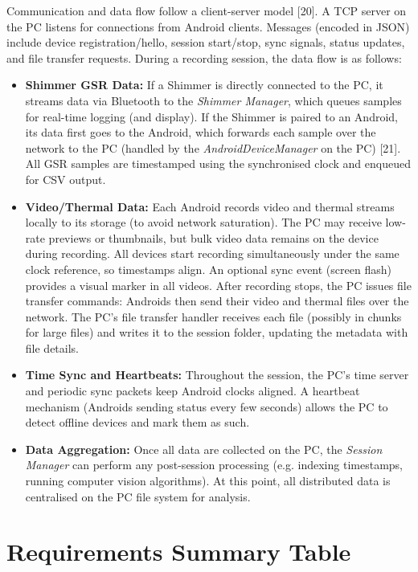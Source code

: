 Communication and data flow follow a client-server model [20]. A TCP server on the PC listens for connections from Android clients. Messages (encoded in JSON) include device registration/hello, session start/stop, sync signals, status updates, and file transfer requests. During a recording session, the data flow is as follows:
\begin{itemize}
    \item \textbf{Shimmer GSR Data:} If a Shimmer is directly connected to the PC, it streams data via Bluetooth to the \textit{Shimmer Manager}, which queues samples for real-time logging (and display). If the Shimmer is paired to an Android, its data first goes to the Android, which forwards each sample over the network to the PC (handled by the \textit{AndroidDeviceManager} on the PC) [21]. All GSR samples are timestamped using the synchronised clock and enqueued for CSV output.
    \item \textbf{Video/Thermal Data:} Each Android records video and thermal streams locally to its storage (to avoid network saturation). The PC may receive low-rate previews or thumbnails, but bulk video data remains on the device during recording. All devices start recording simultaneously under the same clock reference, so timestamps align. An optional sync event (screen flash) provides a visual marker in all videos. After recording stops, the PC issues file transfer commands: Androids then send their video and thermal files over the network. The PC’s file transfer handler receives each file (possibly in chunks for large files) and writes it to the session folder, updating the metadata with file details.
    \item \textbf{Time Sync and Heartbeats:} Throughout the session, the PC’s time server and periodic sync packets keep Android clocks aligned. A heartbeat mechanism (Androids sending status every few seconds) allows the PC to detect offline devices and mark them as such.
    \item \textbf{Data Aggregation:} Once all data are collected on the PC, the \textit{Session Manager} can perform any post-session processing (e.g. indexing timestamps, running computer vision algorithms). At this point, all distributed data is centralised on the PC file system for analysis.
\end{itemize}

\section{Requirements Summary Table}

